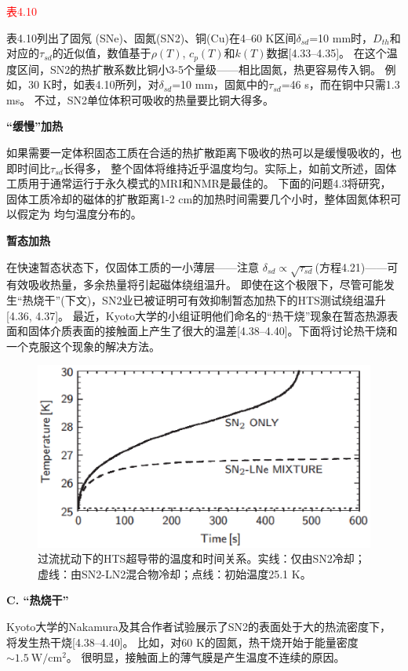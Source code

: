 \textcolor{red}{表4.10}

表4.10列出了固氖 (SNe)、固氮(SN2)、铜(Cu)在4–60 K区间$\delta_{sd}$=10 mm时，$D_{th}$和对应的$\tau_{sd}$的近似值，数值基于$\rho(T)$, $c_p(T)$和$k(T)$数据[4.33–4.35]。
在这个温度区间，SN2的热扩散系数比铜小3-5个量级——相比固氮，热更容易传入铜。
例如，30 K时，如表4.10所列，对$\delta_{sd}$=10 mm，固氮中的$\tau_{sd}$=46 s，而在铜中只需1.3 ms。
不过，SN2单位体积可吸收的热量要比铜大得多。

\textbf{“缓慢”加热}

如果需要一定体积固态工质在合适的热扩散距离下吸收的热可以是缓慢吸收的，也即时间比$\tau_{sd}$长得多，
整个固体将维持近乎温度均匀。实际上，如前文所述，固体工质用于通常运行于永久模式的MRI和NMR是最佳的。
下面的问题4.3将研究，固体工质冷却的磁体的扩散距离1-2 cm的加热时间需要几个小时，整体固氮体积可以假定为
均匀温度分布的。

\textbf{暂态加热}

在快速暂态状态下，仅固体工质的一小薄层——注意
$\delta_{sd}\propto\sqrt{\tau_{sd}}$(方程4.21)——可有效吸收热量，多余热量将引起磁体绕组温升。
即使在这个极限下，尽管可能发生“热烧干”(下文)，SN2业已被证明可有效抑制暂态加热下的HTS测试绕组温升[4.36, 4.37]。
最近，Kyoto大学的小组证明他们命名的“热干烧”现象在暂态热源表面和固体介质表面的接触面上产生了很大的温差[4.38–4.40]。下面将讨论热干烧和一个克服这个现象的解决方法。

\begin{figure}[htbp]
	\centering
	\includegraphics[scale=0.75]{chpt4/figs/fig4.17.eps}
	\caption{过流扰动下的HTS超导带的温度和时间关系。实线：仅由SN2冷却；虚线：由SN2-LN2混合物冷却；点线：初始温度25.1 K。}
\end{figure}


\textbf{C. “热烧干”}

Kyoto大学的Nakamura及其合作者试验展示了SN2的表面处于大的热流密度下，将发生热干烧[4.38–4.40]。
比如，对60 K的固氮，热干烧开始于能量密度$\sim 1.5\ \mathrm{W/cm^2}$。
很明显，接触面上的薄气膜是产生温度不连续的原因。

